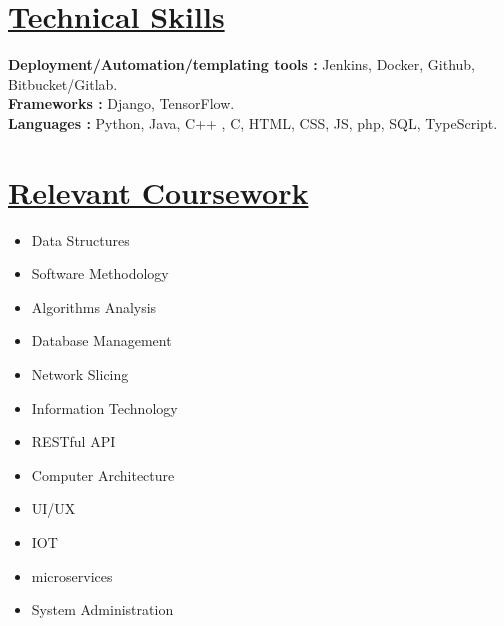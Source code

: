 \documentclass[letterpaper,11pt]{article}
\newcommand{\resumeSubHeadingListStart}{\begin{itemize}[leftmargin=0.0in, label={}]}
\newcommand{\resumeSubHeadingListEnd}{\end{itemize}}
\begin{document}
\section{\href{https://www.linkedin.com/in/yakkshit/details/skills/}{Technical Skills} \faLink}
\vspace{-5pt}
 \begin{itemize}[leftmargin=0.15in, label={}]
    \small{\item{
     \textbf{Deployment/Automation/templating tools : }{Jenkins, Docker, Github, Bitbucket/Gitlab.} \\
     \textbf{Frameworks : }{Django, TensorFlow.}\\
     \textbf{Languages : }{ Python, Java, C++ , C, HTML, CSS, JS, php, SQL, TypeScript.}\\
    }}
 \end{itemize}
\vspace{-20pt}
\section{\href{https://www.linkedin.com/in/yakkshit/details/courses/}{Relevant Coursework} \faLink}
    \vspace{-4pt}
        \begin{multicols}{4}
            \begin{itemize}[itemsep=-4pt, parsep=3pt]
                \item\small Data Structures
                \item Software Methodology
                \item Algorithms Analysis
                \item Database Management
                \item Network Slicing
                \item Information Technology
                \item RESTful API
                \item Computer Architecture \\
                \item UI/UX
                \item IOT
                \item microservices
                \item System Administration\\
            \end{itemize}
        \end{multicols}
        \vspace*{2.0\multicolsep}
\vspace{-7pt}
\end{document}
